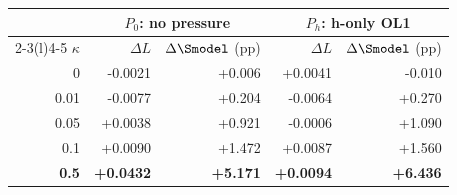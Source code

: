\begin{tabular}{@{}rrrrr@{}}
\toprule
 & \multicolumn{2}{c}{$P_0$: no pressure} & \multicolumn{2}{c}{$P_h$: h-only OL1} \\
\cmidrule(lr){2-3}\cmidrule(l){4-5}
$\kappa$ & $\Delta L$ & $\Delta\Smodel$ (pp) & $\Delta L$ & $\Delta\Smodel$ (pp) \\
\midrule
0 & -0.0021 & +0.006 & +0.0041 & -0.010 \\
0.01 & -0.0077 & +0.204 & -0.0064 & +0.270 \\
0.05 & +0.0038 & +0.921 & -0.0006 & +1.090 \\
0.1 & +0.0090 & +1.472 & +0.0087 & +1.560 \\
\textbf{0.5} & \textbf{+0.0432} & \textbf{+5.171} & \textbf{+0.0094} & \textbf{+6.436} \\
\bottomrule
\end{tabular}
